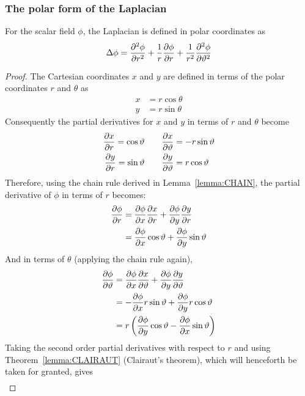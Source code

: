 \subsubsection{The polar form of the Laplacian}\label{section:POLAR-LAPLACIAN}
\begin{lemma}
    For the scalar field $\phi$, the Laplacian is defined in polar coordinates as
    $$\Delta\phi=\pdv[2]{\phi}{r}+\frac{1}{r}\pdv{\phi}{r}+\frac{1}{r^2}\pdv[2]{\phi}{\vartheta}$$

    \begin{proof}
        The Cartesian coordinates $x$ and $y$ are defined in terms of the polar coordinates $r$ and $\theta$ as
        \begin{align*}
            x&=r\cos\theta\\
            y&=r\sin\theta
        \end{align*}
        Consequently the partial derivatives for $x$ and $y$ in terms of $r$ and $\theta$ become
        \begin{align*}
            \pdv{x}{r}=\cos\vartheta\quad&\quad\pdv{x}{\vartheta}=-r\sin\vartheta\\
            \pdv{y}{r}=\sin\vartheta\quad&\quad\pdv{y}{\vartheta}=r\cos\vartheta
        \end{align*} 
        Therefore, using the chain rule derived in Lemma~\ref{lemma:CHAIN}, the partial derivative of $\phi$ in terms of $r$ becomes:
        \begin{align}
            \notag\pdv{\phi}{r}&=\pdv{\phi}{x}\pdv{x}{r}+\pdv{\phi}{y}\pdv{y}{r}\\
            \label{equation:polar-laplacian:1}&=\pdv{\phi}{x}\cos\vartheta+\pdv{\phi}{y}\sin\vartheta
        \end{align}
        And in terms of $\theta$ (applying the chain rule again),
        \begin{align}
            \notag\pdv{\phi}{\vartheta}&=\pdv{\phi}{x}\pdv{x}{\vartheta}+\pdv{\phi}{y}\pdv{y}{\vartheta}\\
            \notag&=-\pdv{\phi}{x}r\sin\vartheta+\pdv{\phi}{y}r\cos\vartheta\\
            \label{equation:polar-laplacian:2}&=r\left(\pdv{\phi}{y}\cos\vartheta-\pdv{\phi}{x}\sin\vartheta\right)
        \end{align}
        Taking the second order partial derivatives with respect to $r$ and using Theorem~\ref{lemma:CLAIRAUT} (Clairaut's theorem), which will henceforth be taken for granted, gives
        \begin{align*}

\end{align*}
\end{proof}
\end{lemma}
